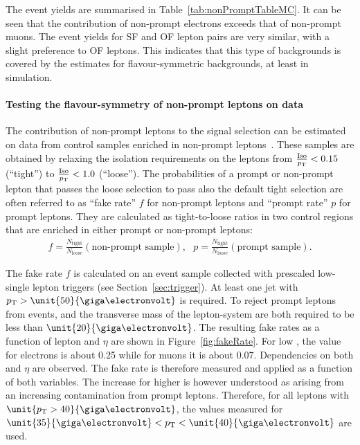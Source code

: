 The event yields are summarised in Table~\ref{tab:nonPromptTableMC}. It can be seen that the contribution of non-prompt electrons exceeds that of non-prompt muons. The event yields for SF and OF lepton pairs are very similar, with a slight preference to OF leptons. This indicates that this type of backgrounds is covered by the estimates for flavour-symmetric backgrounds, at least in simulation.


\paragraph*{Testing the flavour-symmetry of non-prompt leptons on data}
The contribution of non-prompt leptons to the signal selection can be estimated on data from control samples enriched in non-prompt leptons~\cite{fakesnote1,fakesnote2}. These samples are obtained by relaxing the isolation requirements on the leptons from $\frac{\text{Iso}}{p_{\mathrm{T}}} < 0.15$ (``tight'') to $\frac{\text{Iso}}{p_{\mathrm{T}}}<1.0$ (``loose''). The probabilities of a prompt or non-prompt lepton that passes the loose selection to pass also the default tight selection are often referred to as ``fake rate'' $f$ for non-prompt leptons and ``prompt rate'' $p$ for prompt leptons. They are calculated as tight-to-loose ratios in two control regions that are enriched in either prompt or non-prompt leptons:
\begin{eqnarray}
f = \frac{N_{\text{tight}}}{N_{\text{loose}}} (\text{non-prompt sample}),\text{                }  p = \frac{N_{\text{tight}}}{N_{\text{loose}}} (\text{prompt sample}).
\end{eqnarray} 

The fake rate $f$ is calculated on an event sample collected with prescaled low-\pt single lepton triggers (see Section~\ref{sec:trigger}). At least one jet with $\pt > \unit{50}{\giga\electronvolt}$ is required. To reject prompt leptons from \Wjets events, \MET and the transverse mass of the lepton-\MET system are both required to be less than $\unit{20}{\giga\electronvolt}$. The resulting fake rates as a function of lepton \pt and $\eta$ are shown in Figure~\ref{fig:fakeRate}. For low \pt, the value for electrons is about 0.25 while for muons it is about 0.07. Dependencies on both \pt and $\eta$ are observed. The fake rate is therefore measured and applied as a function of both variables. The increase for higher \pt is however understood as arising from an increasing contamination from prompt leptons. Therefore, for all leptons with $\unit{\pt > 40}{\giga\electronvolt}$, the values measured for $\unit{35}{\giga\electronvolt} < \pt < \unit{40}{\giga\electronvolt}$ are used.  

